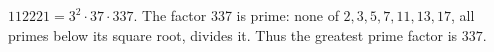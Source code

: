 $ 112221=3^2\cdot37\cdot337 $. The factor 337 is prime: none of $ 2,3,5,7,11,13,17 $, all primes below its square root, divides it. Thus the greatest prime factor is $\boxed{337}$.
